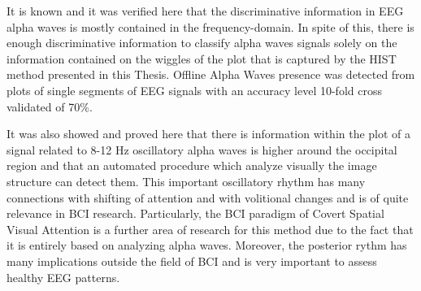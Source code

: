 It is known and it was verified here that the discriminative information in EEG alpha waves is mostly contained in the frequency-domain.  In spite of this,  there is enough discriminative information to classify alpha waves signals solely on the information contained on the wiggles of the plot that is captured by the HIST method presented in this Thesis.  Offline Alpha Waves presence was detected from plots of single segments of EEG signals with an accuracy level 10-fold cross validated of 70\%.

It was also showed and proved here that there is information within the plot of a signal related to 8-12 Hz oscillatory alpha waves is higher around the occipital region and that an automated procedure which analyze visually the image structure can detect them. This important oscillatory rhythm has many connections with shifting of attention and with volitional changes and is of quite relevance in BCI research.  Particularly, the BCI paradigm of Covert Spatial Visual Attention is a further area of research for this method due to the fact that it is entirely based on analyzing alpha waves. Moreover, the posterior rythm has many implications outside the field of BCI and is very important to assess healthy EEG patterns.

%




